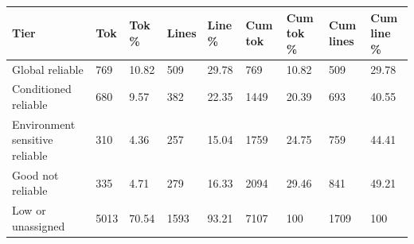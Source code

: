 \begin{tabular}{lllllllll}
\toprule
Tier & Tok & Tok \% & Lines & Line \% & Cum tok & Cum tok \% & Cum lines & Cum line \% \\
\midrule
Global reliable & 769 & 10.82 & 509 & 29.78 & 769 & 10.82 & 509 & 29.78 \\
Conditioned reliable & 680 & 9.57 & 382 & 22.35 & 1449 & 20.39 & 693 & 40.55 \\
Environment sensitive reliable & 310 & 4.36 & 257 & 15.04 & 1759 & 24.75 & 759 & 44.41 \\
Good not reliable & 335 & 4.71 & 279 & 16.33 & 2094 & 29.46 & 841 & 49.21 \\
Low or unassigned & 5013 & 70.54 & 1593 & 93.21 & 7107 & 100 & 1709 & 100 \\
\bottomrule
\end{tabular}